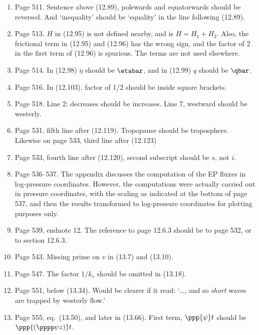 \documentclass[10pt]{article}
\newcommand{\eq}{eq.\ } \newcommand{\Eq}{Eq.\ }
\begin{document}
\begin{enumerate}
\item Page 511. Sentence above (12.89), polewards and equatorwards should be reversed. And `inequality' should be `equality' in the line following (12.89).

\item Page 513. $H$ in (12.95) is not defined nearby, and is $H = H_1 + H_2$. Also, the frictional term in (12.95) and (12.96) has the wrong sign, and the factor of 2 in the first term of (12.96) is spurious. The terms are not used elsewhere.

\item Page 514. In (12.98) $\eta$ should be $\etabar$, and in (12.99) $q$ should be $\qbar$.

\item Page 516. In (12.103), factor of 1/2 should be inside square brackets.

\item Page 518. Line 2: decreases should be increases. Line 7, westward should be westerly. 

\item Page 531, fifth line after (12.119). Tropopause should be troposphere. Likewise on page 533, third line after (12.123) 

\item Page 533, fourth line after (12.120), second subscript should be $s$, not $i$. 

\item Page 536--537. The appendix discusses the computation of the EP fluxes in log-pressure coordinates. However, the computations were actually carried out in pressure coordinates, with the scaling as indicated at the bottom of page 537, and then the results transformed to log-pressure coordinates for plotting purposes only. 

\item Page 539, endnote 12. The reference to page 12.6.3 should be to page 532, or to section 12.6.3.

\item Page 543. Missing prime on $v$ in (13.7) and (13.10).
 
\item Page 547. The factor $1/k_s$ should be omitted in (13.18).

\item Page 551, below (13.34). Would be clearer if it read: `\ldots, and so \emph{short} waves are trapped by westerly flow.'

\item Page 555, \eq (13.50), and later in (13.66). First term, $\ppp{\psi} t$ should be $\ppp{ (\pppp \psi z)} t$.  


\end{enumerate}
\end{document}
